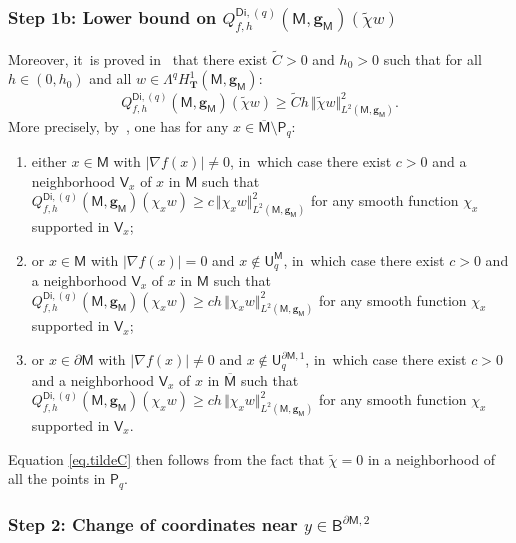 \documentclass[10pt]{amsart}
\newcommand{\mbf}[1]{\mathbf{#1}}
\let\pa\partial
\theoremstyle{plain}
\theoremstyle{definition}
\begin{document}
\subsubsection*{Step 1b: Lower bound on $Q_{f,h}^{\mathsf{Di},(q)}(\mathsf M,\mbf g_{\mathsf M})(\tilde \chi w)$} Moreover, it~is proved
in~\cite[\S3.4]{helffer-nier-06} that there exist $\tilde C>0$ and $h_0>0$ such that for all $h\in (0,h_0)$ and all $w\in \Lambda^qH^1_{\mbf T}(\mathsf M,\mbf g_{\mathsf M})$:
\begin{equation}\label{eq.tildeC}
Q_{f,h}^{\mathsf{Di},(q)}(\mathsf M,\mbf g_{\mathsf M})(\tilde \chi w)\ge \tilde Ch\, \Vert\tilde \chi w \Vert_{L^2(\mathsf M,\mbf g_{\mathsf M})}^2.
\end{equation}
More precisely, by~\cite[\S3.4]{helffer-nier-06}, one has for any $x\in \overline{\mathsf M}\setminus \mathsf P_q$:
\begin{enumerate}
\item\label{step:1b1}
either $x\in \mathsf M$ with $\vert \nabla f(x)\vert \neq 0$, in~which case there exist $c>0$ and a neighborhood $\mathsf V_x$ of $x$ in $\mathsf M$ such that $Q_{f,h}^{\mathsf{Di},(q)}(\mathsf M,\mbf g_{\mathsf M})(\chi_x w)\ge c\, \Vert \chi_x w \Vert_{L^2(\mathsf M,\mbf g_{\mathsf M})}^2$ for any smooth function $\chi_x$ supported in $\mathsf V_x$;
\item\label{step:1b2}
or $x\in \mathsf M$ with $\vert \nabla f(x)\vert = 0$ and $x\notin \mathsf U_q^{\mathsf M}$, in~which case there exist $c>0$ and a neighborhood $\mathsf V_x$ of $x$ in $\mathsf M$ such that $Q_{f,h}^{\mathsf{Di},(q)}(\mathsf M,\mbf g_{\mathsf M})(\chi_x w)\ge ch\, \Vert \chi_x w \Vert_{L^2(\mathsf M,\mbf g_{\mathsf M})}^2$ for any smooth function $\chi_x$ supported in $\mathsf V_x$;
\item\label{step:1b3}
or $x\in \pa \mathsf M$ with $\vert \nabla f(x)\vert \neq 0$ and $x\notin \mathsf U^{\pa \mathsf M,1}_q$, in~which case there exist $c>0$ and a neighborhood $\mathsf V_x$ of $x$ in $\overline{\mathsf M}$ such that $Q_{f,h}^{\mathsf{Di},(q)}(\mathsf M,\mbf g_{\mathsf M})(\chi_x w)\ge ch\, \Vert \chi_x w \Vert_{L^2(\mathsf M,\mbf g_{\mathsf M})}^2$ for any smooth function $\chi_x$ supported in $\mathsf V_x$.
\end{enumerate}
Equation \eqref{eq.tildeC} then follows from the fact that $\tilde \chi=0$ in a neighborhood of
all the points in $\mathsf P_q$.

\subsubsection*{Step 2: Change of coordinates near $y\in \mathsf B^{\pa \mathsf M,2}$}
\end{document}
